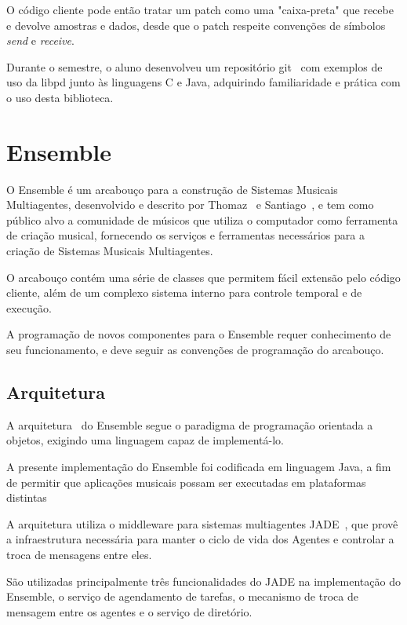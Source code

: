 \documentclass[a4paper, 11pt, twoside]{article}
\begin{document}
\begin{multicols}{2}
O código cliente pode então tratar um patch como
uma "caixa-preta" que recebe e devolve amostras
e dados, desde que o patch respeite convenções
de símbolos \textit{send} e \textit{receive}.

Durante o semestre, o aluno desenvolveu um repositório git~\cite{ensemble_git}
com exemplos de uso da libpd junto às linguagens C e Java,
adquirindo familiaridade e prática com o uso desta biblioteca.

\section{Ensemble}

O Ensemble é um arcabouço para a construção de Sistemas Musicais Multiagentes, 
desenvolvido e descrito por Thomaz~\cite{leandro11} e 
Santiago~\cite{santiago12}, e tem como público alvo a comunidade de músicos que
utiliza o computador como ferramenta de criação musical, fornecendo os serviços
e ferramentas necessários para a criação de Sistemas Musicais Multiagentes. 

O arcabouço contém uma série de classes que permitem fácil extensão pelo
código cliente, além de um complexo sistema interno para
controle temporal e de execução.

A programação de novos componentes para o Ensemble requer conhecimento de seu 
funcionamento, e deve seguir as convenções de programação do arcabouço. 

\subsection{Arquitetura}

A arquitetura~\cite{leandro11} do Ensemble segue o paradigma de programação 
orientada a objetos, exigindo uma linguagem capaz de implementá-lo.

A presente implementação do Ensemble foi codificada em linguagem Java, a fim de
permitir que aplicações musicais possam ser executadas em plataformas distintas

A arquitetura utiliza o middleware para sistemas multiagentes JADE~\cite{belli99}, 
que provê a infraestrutura necessária para manter o ciclo de vida dos Agentes e
controlar a troca de mensagens entre eles.

São utilizadas principalmente três funcionalidades do JADE na implementação do
Ensemble, o serviço de agendamento de tarefas, o mecanismo de troca de mensagem
entre os agentes e o serviço de diretório.


\end{multicols}
\end{document}
